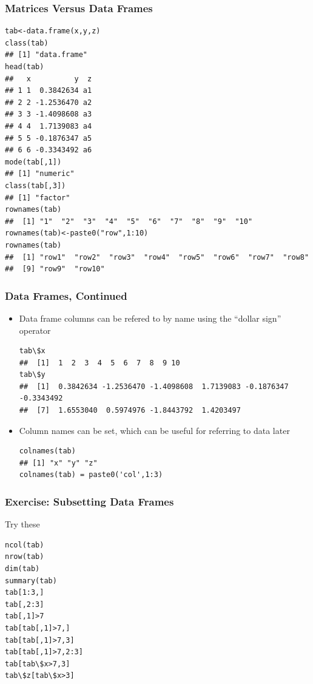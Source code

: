 \documentclass[]{article}
\theoremstyle{definition}
\theoremstyle{definition}
\theoremstyle{remark}
\begin{document}
\subsubsection{Matrices Versus Data
Frames}\label{matrices-versus-data-frames-1}

\begin{verbatim}
tab<-data.frame(x,y,z)
class(tab)
## [1] "data.frame"
head(tab)
##   x          y  z
## 1 1  0.3842634 a1
## 2 2 -1.2536470 a2
## 3 3 -1.4098608 a3
## 4 4  1.7139083 a4
## 5 5 -0.1876347 a5
## 6 6 -0.3343492 a6
mode(tab[,1])
## [1] "numeric"
class(tab[,3])
## [1] "factor"
rownames(tab)           
##  [1] "1"  "2"  "3"  "4"  "5"  "6"  "7"  "8"  "9"  "10"
rownames(tab)<-paste0("row",1:10)
rownames(tab)
##  [1] "row1"  "row2"  "row3"  "row4"  "row5"  "row6"  "row7"  "row8" 
##  [9] "row9"  "row10"
\end{verbatim}

\subsubsection{Data Frames, Continued}\label{data-frames-continued}

\begin{itemize}
\item
  {Data frame columns can be refered to by name using the ``dollar
  sign'' operator}

\begin{verbatim}
tab\$x
##  [1]  1  2  3  4  5  6  7  8  9 10
tab\$y
##  [1]  0.3842634 -1.2536470 -1.4098608  1.7139083 -0.1876347 -0.3343492
##  [7]  1.6553040  0.5974976 -1.8443792  1.4203497
\end{verbatim}
\item
  {Column names can be set, which can be useful for referring to data
  later}

\begin{verbatim}
colnames(tab)
## [1] "x" "y" "z"
colnames(tab) = paste0('col',1:3)
\end{verbatim}
\end{itemize}

\subsubsection{Exercise: Subsetting Data
Frames}\label{exercise-subsetting-data-frames}

Try these

\begin{verbatim}
ncol(tab)
nrow(tab)
dim(tab)
summary(tab)
tab[1:3,]
tab[,2:3]
tab[,1]>7
tab[tab[,1]>7,]
tab[tab[,1]>7,3]
tab[tab[,1]>7,2:3]
tab[tab\$x>7,3]
tab\$z[tab\$x>3]
\end{verbatim}
\end{document}
